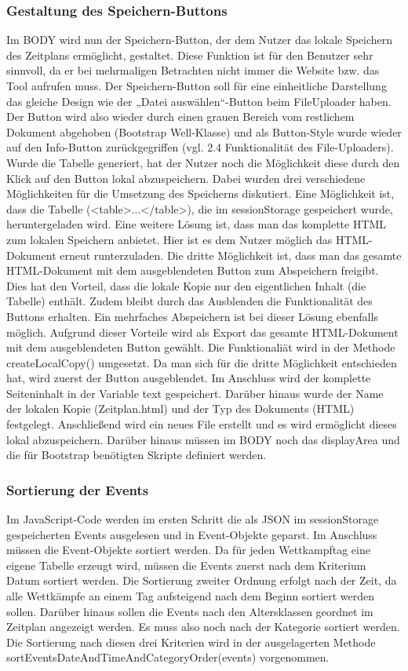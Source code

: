 {\subsubsection{Gestaltung des Speichern-Buttons}
Im BODY wird nun der Speichern-Button, der dem Nutzer das lokale Speichern des Zeitplans ermöglicht, gestaltet. Diese Funktion ist für den Benutzer sehr sinnvoll, da er bei mehrmaligen Betrachten nicht immer die Website bzw. das Tool aufrufen muss. Der Speichern-Button soll für eine einheitliche Darstellung das gleiche Design wie der „Datei auswählen“-Button beim FileUploader haben. Der Button wird also wieder durch einen grauen Bereich vom restlichem Dokument abgehoben (Bootstrap Well-Klasse) und als Button-Style wurde wieder auf den Info-Button zurückgegriffen (vgl. 2.4 Funktionalität des File-Uploaders).
Wurde die Tabelle generiert, hat der Nutzer noch die Möglichkeit diese durch den Klick auf den Button lokal abzuspeichern. Dabei wurden drei verschiedene Möglichkeiten für die Umsetzung des Speicherns diskutiert. Eine Möglichkeit ist, dass die Tabelle (<table>...</table>), die im sessionStorage gespeichert wurde, heruntergeladen wird. Eine weitere Lösung ist, dass man das komplette HTML zum lokalen Speichern anbietet. Hier ist es dem Nutzer möglich das HTML-Dokument erneut runterzuladen. Die dritte Möglichkeit ist, dass man das gesamte HTML-Dokument mit dem ausgeblendeten Button zum Abspeichern freigibt. Dies hat den Vorteil, dass die lokale Kopie nur den eigentlichen Inhalt (die Tabelle) enthält. Zudem bleibt durch das Ausblenden die Funktionalität des Buttons erhalten. Ein mehrfaches Abspeichern ist bei dieser Lösung ebenfalls möglich. Aufgrund dieser Vorteile wird als Export das gesamte HTML-Dokument mit dem ausgeblendeten Button gewählt. 
Die Funktionaliät wird in der Methode createLocalCopy() umgesetzt. Da man sich für die dritte Möglichkeit entschieden hat, wird zuerst der Button ausgeblendet. Im Anschluss wird der komplette Seiteninhalt in der Variable text gespeichert. Darüber hinaus wurde der Name der lokalen Kopie (Zeitplan.html) und der Typ des Dokuments (HTML) festgelegt. Anschließend wird ein neues File erstellt und es wird ermöglicht dieses lokal abzuspeichern.
Darüber hinaus müssen im BODY noch das displayArea und die für Bootstrap benötigten Skripte definiert werden.

\subsubsection{Sortierung der Events}
Im JavaScript-Code werden im ersten Schritt die als JSON im sessionStorage gespeicherten Events ausgelesen und in Event-Objekte geparst. Im Anschluss müssen die Event-Objekte sortiert werden. Da für jeden Wettkampftag eine eigene Tabelle erzeugt wird, müssen die Events zuerst nach dem Kriterium Datum sortiert werden. Die Sortierung zweiter Ordnung erfolgt nach der Zeit, da alle Wettkämpfe an einem Tag aufsteigend nach dem Beginn sortiert werden sollen. Darüber hinaus sollen die Events nach den Altersklassen geordnet im Zeitplan angezeigt werden. Es muss also noch nach der Kategorie sortiert werden. Die Sortierung nach diesen drei Kriterien wird in der ausgelagerten Methode sortEventsDateAndTimeAndCategoryOrder(events) vorgenommen.

}
